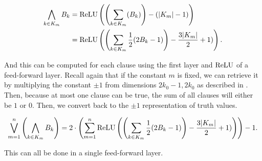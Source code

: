     \begin{align*}
    \bigwedge_{k\in K_m} B_k &= \text{ReLU}\left(\left(\sum_{k\in K_m} (B_k)\right) -(|K_m|-1)\right) \\ &=\text{ReLU}\left(\left(\sum_{k\in K_m} \frac{1}{2}(2B_k-1) \right) - \frac{3|K_m|}{2}+1)\right).
    \end{align*}
    
    And this can be computed for each clause using the first layer and $\text{ReLU}$ of a feed-forward layer. Recall again that if the constant $m$ is fixed, we can retrieve it by multiplying the constant $\pm 1$ from dimensions $2k_0-1,2k_0$ as described in . Then, because at most one clause can be true, the sum of all clauses will either be $1$ or $0$. Then, we convert back to the $\pm1$ representation of truth values. 

    \[\bigvee_{m=1}^n \left(\bigwedge_{k\in K_m} B_k \right)=2\cdot\left(\sum_{m=1}^n\text{ReLU}\left(\left(\sum_{k\in K_m} \frac{1}{2}(2B_k-1) \right) - \frac{3|K_m|}{2}+1)\right)\right)-1.\]

    This can all be done in a single feed-forward layer.
